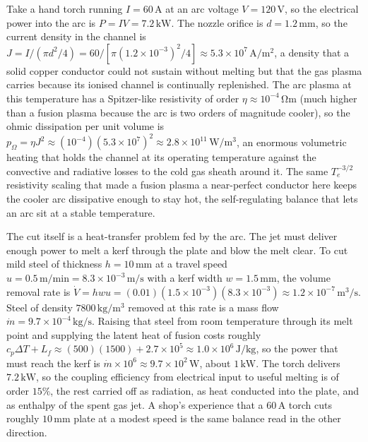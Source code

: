 Take a hand torch running $I = 60\,\si{\ampere}$ at an arc voltage $V =
120\,\si{\volt}$, so the electrical power into the arc is $P = IV = 7.2\,\si{
\kilo\watt}$. The nozzle orifice is $d = 1.2\,\si{\milli\meter}$, so the
current density in the channel is $J = I/(\pi d^{2}/4) = 60/[\pi(1.2\times
10^{-3})^{2}/4] \approx 5.3\times 10^{7}\,\si{\ampere\per\meter\squared}$, a
density that a solid copper conductor could not sustain without melting but
that the gas plasma carries because its ionised channel is continually
replenished. The arc plasma at this temperature has a Spitzer-like
resistivity of order $\eta \approx 10^{-4}\,\si{\ohm\meter}$ (much higher
than a fusion plasma because the arc is two orders of magnitude cooler), so
the ohmic dissipation per unit volume is $p_{\Omega} = \eta J^{2} \approx
(10^{-4})(5.3\times 10^{7})^{2} \approx 2.8\times 10^{11}\,\si{\watt\per
\meter\cubed}$, an enormous volumetric heating that holds the channel at its
operating temperature against the convective and radiative losses to the
cold gas sheath around it. The same $T_{e}^{-3/2}$ resistivity scaling that
made a fusion plasma a near-perfect conductor here keeps the cooler arc
dissipative enough to stay hot, the self-regulating balance that lets an arc
sit at a stable temperature.

The cut itself is a heat-transfer problem fed by the arc. The jet must
deliver enough power to melt a kerf through the plate and blow the melt
clear. To cut mild steel of thickness $h = 10\,\si{\milli\meter}$ at a
travel speed $u = 0.5\,\si{\meter\per\minute} = 8.3\times 10^{-3}\,\si{\meter
\per\second}$ with a kerf width $w = 1.5\,\si{\milli\meter}$, the volume
removal rate is $\dot{V} = h w u = (0.01)(1.5\times 10^{-3})(8.3\times
10^{-3}) \approx 1.2\times 10^{-7}\,\si{\meter\cubed\per\second}$. Steel of
density $7800\,\si{\kilogram\per\meter\cubed}$ removed at this rate is a mass
flow $\dot{m} = 9.7\times 10^{-4}\,\si{\kilogram\per\second}$. Raising that
steel from room temperature through its melt point and supplying the latent
heat of fusion costs roughly $c_{p}\Delta T + L_{f} \approx (500)(1500) +
2.7\times 10^{5} \approx 1.0\times 10^{6}\,\si{\joule\per\kilogram}$, so the
power that must reach the kerf is $\dot{m}\times 10^{6} \approx 9.7\times
10^{2}\,\si{\watt}$, about $1\,\si{\kilo\watt}$. The torch delivers
$7.2\,\si{\kilo\watt}$, so the coupling efficiency from electrical input to
useful melting is of order $15\%$, the rest carried off as radiation, as
heat conducted into the plate, and as enthalpy of the spent gas jet. A
shop's experience that a $60\,\si{\ampere}$ torch cuts roughly
$10\,\si{\milli\meter}$ plate at a modest speed is the same balance read in
the other direction.

